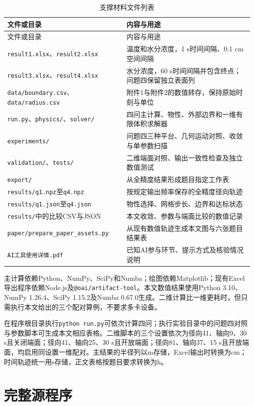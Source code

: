 \begin{longtable}{p{}p{}}
\caption{支撑材料文件列表}\label{tab:support-files}\\
\toprule 文件或目录 & 内容与用途\\\midrule\endfirsthead
\toprule 文件或目录 & 内容与用途\\\midrule\endhead
\bottomrule\endfoot
\texttt{result1.xlsx}、\texttt{result2.xlsx} & 温度和水分浓度，1 s时间间隔、0.1 cm空间间隔\\
\texttt{result3.xlsx}、\texttt{result4.xlsx} & 水分浓度，60 s时间间隔并包含终点；问题四保留独立表面列\\
\texttt{data/boundary.csv}、\texttt{data/radius.csv} & 附件1与附件2的数值转存，保持原始时刻与单位\\
\texttt{run.py}、\texttt{physics/}、\texttt{solver/} & 四问主计算、物性、外部边界和一维有限体积求解器\\
\texttt{experiments/} & 问题四三种平台、几何运动对照、收敛与单参数扫描\\
\texttt{validation/}、\texttt{tests/} & 二维端面对照、输出一致性检查及独立数值测试\\
\texttt{export/} & 从全精度结果形成题目指定工作表\\
\texttt{results/q1.npz}至\texttt{q4.npz} & 按规定输出频率保存的全精度径向轨迹\\
\texttt{results/q1.json}至\texttt{q4.json} & 物性选择、网格步长、边界和达标状态\\
\texttt{results/}中的比较CSV与JSON & 本文收敛、参数与端面比较的数值记录\\
\texttt{paper/prepare\_paper\_assets.py} & 从现有数值轨迹生成本文图与六张题目结果表\\
\texttt{AI工具使用详情.pdf} & 已知AI参与环节、提示方式及核验情况说明\\
\end{longtable}

主计算依赖Python、NumPy、SciPy和Numba；绘图依赖Matplotlib；现有Excel导出程序依赖Node.js及\texttt{@oai/artifact-tool}。本文数值结果使用Python 3.10、NumPy 1.26.4、SciPy 1.15.2及Numba 0.67.0生成。二维计算比一维更耗时，但只需执行本文给出的三个配对算例，不要求多卡设备。

在程序根目录执行\texttt{python run.py}可依次计算四问；执行实验目录中的问题四对照与参数脚本可生成本文相应表格。二维脚本的三个设置依次为径向41、轴向9、30 s且关闭端面；径向41、轴向25、30 s且开放端面；径向81、轴向37、15 s且开放端面，均启用同设置一维配对。主结果的半径列以m存储，Excel输出时转换为cm；时间轨迹统一用s存储，正文表格按题目要求转换为h。

\section{完整源程序}


